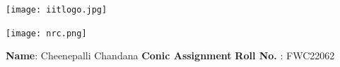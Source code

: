 \documentclass[10pt,a4paper]{report}
\begin{document}
\begin{figure*}[!tbp]
  \centering
  \begin{minipage}[b]{0.4\textwidth}
    \texttt{[image: iitlogo.jpg]} 
  \end{minipage}
  \hfill
  \vspace{5mm}\begin{minipage}[b]{0.4\textwidth}
\raggedleft  \texttt{[image: nrc.png]}  \

  \end{minipage}\vspace{0.2cm}
\end{figure*}
\raggedright \textbf{Name}:\hspace{1mm} Cheenepalli Chandana\hspace{2cm} \Large \textbf{Conic Assignment}\hspace{2.5cm} %
\normalsize \textbf{Roll No.} :\hspace{1mm} FWC22062\vspace{1cm}
\end{document}
